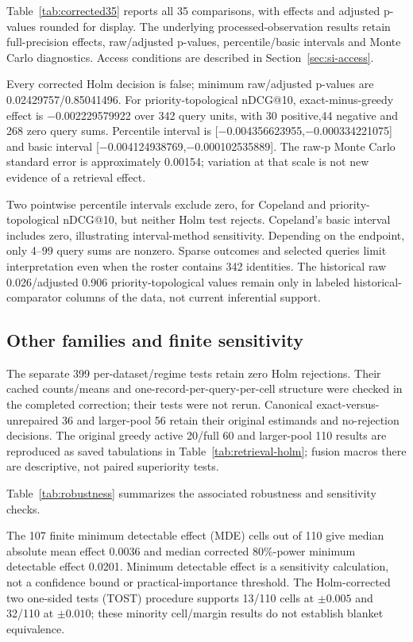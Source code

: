 \documentclass[pdflatex,sn-basic,Numbered]{sn-jnl}
\begin{document}
Table~\ref{tab:corrected35} reports all 35 comparisons, with effects and adjusted p-values rounded for display. The underlying processed-observation results retain full-precision effects, raw/adjusted p-values, percentile/basic intervals and Monte Carlo diagnostics. Access conditions are described in Section~\ref{sec:si-access}.
\FloatBarrier

Every corrected Holm decision is false; minimum raw/adjusted p-values are 0.02429757/0.85041496. For priority-topological nDCG@10, exact-minus-greedy effect is −0.002229579922 over 342 query units, with 30 positive,44 negative and 268 zero query sums. Percentile interval is [−0.004356623955,−0.000334221075] and basic interval [−0.004124938769,−0.000102535889]. The raw-p Monte Carlo standard error is approximately 0.00154; variation at that scale is not new evidence of a retrieval effect.

Two pointwise percentile intervals exclude zero, for Copeland and priority-topological nDCG@10, but neither Holm test rejects. Copeland's basic interval includes zero, illustrating interval-method sensitivity. Depending on the endpoint, only 4--99 query sums are nonzero. Sparse outcomes and selected queries limit interpretation even when the roster contains 342 identities. The historical raw 0.026/adjusted 0.906 priority-topological values remain only in labeled historical-comparator columns of the data, not current inferential support.

\subsection{Other families and finite sensitivity}
The separate 399 per-dataset/regime tests retain zero Holm rejections. Their cached counts/means and one-record-per-query-per-cell structure were checked in the completed correction; their tests were not rerun. Canonical exact-versus-unrepaired 36 and larger-pool 56 retain their original estimands and no-rejection decisions. The original greedy active 20/full 60 and larger-pool 110 results are reproduced as saved tabulations in Table~\ref{tab:retrieval-holm}; fusion macros there are descriptive, not paired superiority tests.

Table~\ref{tab:robustness} summarizes the associated robustness and sensitivity checks.


The 107 finite minimum detectable effect (MDE) cells out of 110 give median absolute mean effect 0.0036 and median corrected 80\%-power minimum detectable effect 0.0201. Minimum detectable effect is a sensitivity calculation, not a confidence bound or practical-importance threshold. The Holm-corrected two one-sided tests (TOST) procedure supports 13/110 cells at $\pm 0.005$ and 32/110 at $\pm 0.010$; these minority cell/margin results do not establish blanket equivalence.
\end{document}
